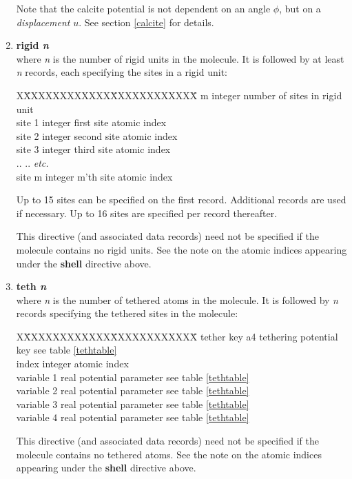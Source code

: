 \begin{enumerate}
\begin{table}[ht]
\begin{centering}
\end{centering}
\end{table}
Note that the calcite potential is not dependent on an angle $\phi$, but on a
{\em displacement} $u$. See section \ref{calcite} for details.
\item{\bf rigid {\em n}}\\
where {\em n} is the number of rigid units in the molecule. It is 
followed by at least {\em n} records, each specifying the sites in a rigid
unit:
\begin{tabbing}
X\=XXXXXXXXXXXX\=XXXXXXXXXXXX\=\kill
\> m \> integer \> number of sites in rigid unit\\
\> site 1 \> integer \> first site atomic index\\
\> site 2 \> integer \> second site atomic  index\\
\> site 3 \> integer \> third site atomic index\\
\> .. \> .. \> {\em etc.}\\
\> site m \> integer \> m'th site atomic index\\
\end{tabbing}
Up to 15 sites can be specified on the first record. Additional records
are used if necessary. Up to 16 sites are specified per record thereafter.

This directive (and associated data records) need not be specified if
the molecule contains no rigid units.
See the note on the atomic indices appearing under the {\bf shell}
directive above.

\item{\bf teth {\em n}}\\
where {\em n} is the number of tethered atoms in the molecule. It is 
followed by {\em n} records specifying the tethered sites in the molecule:
\begin{tabbing}
X\=XXXXXXXXXXXX\=XXXXXXXXXXXX\=\kill
\> tether key \> a4 \> tethering potential key  see table \ref{tethtable}\\
\> index \> integer \> atomic index \\
\> variable 1 \> real \> potential parameter see table
\ref{tethtable}\\
\> variable 2 \> real \> potential parameter see table
\ref{tethtable}\\
\> variable 3 \> real \> potential parameter see table
\ref{tethtable}\\
\> variable 4 \> real \> potential parameter see table
\ref{tethtable}\\
\end{tabbing}
This directive (and associated data records) need not be specified if
the molecule contains no tethered atoms.
See the note on the atomic indices appearing under the {\bf shell}
directive above.
 

\end{enumerate}
